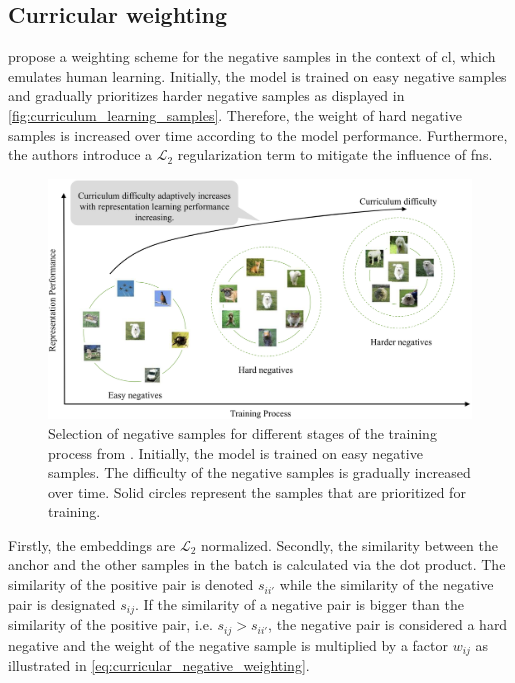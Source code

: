 \subsection{Curricular weighting}\label{subsec:curricular_weighting}

\citet{curricular_weighting_2024} propose a weighting scheme for the negative samples 
in the context of \ac{cl}, which emulates human learning.
Initially, the model is trained on easy negative samples and gradually prioritizes harder negative samples 
as displayed in \autoref{fig:curriculum_learning_samples}.
Therefore, the weight of hard negative samples is increased over time according to the model performance.
Furthermore, the authors introduce a $\mathcal{L}_2$ regularization term to mitigate the influence of \acp{fn}.

\begin{figure}[!htb] %
    \centering
    \includegraphics[width=360pt]{images/curriculum_learning_samples.png}
    \caption{Selection of negative samples for different stages of the training process 
    from \citet{curricular_weighting_2024}.
    Initially, the model is trained on easy negative samples.
    The difficulty of the negative samples is gradually increased over time.
    Solid circles represent the samples that are prioritized for training.
    }
    \label{fig:curriculum_learning_samples}
\end{figure}

Firstly, the embeddings are $\mathcal{L}_2$ normalized.
Secondly, the similarity between the anchor and the other samples in the batch is calculated via the dot product.
The similarity of the positive pair is denoted $s_{ii'}$ while the similarity of the negative pair is designated $s_{ij}$.
If the similarity of a negative pair is bigger than the similarity of the positive pair, 
i.e. $s_{ij} > s_{ii'}$, the negative pair is considered a hard negative and 
the weight of the negative sample is multiplied by a factor $w_{ij}$ 
as illustrated in \eqref{eq:curricular_negative_weighting}.

